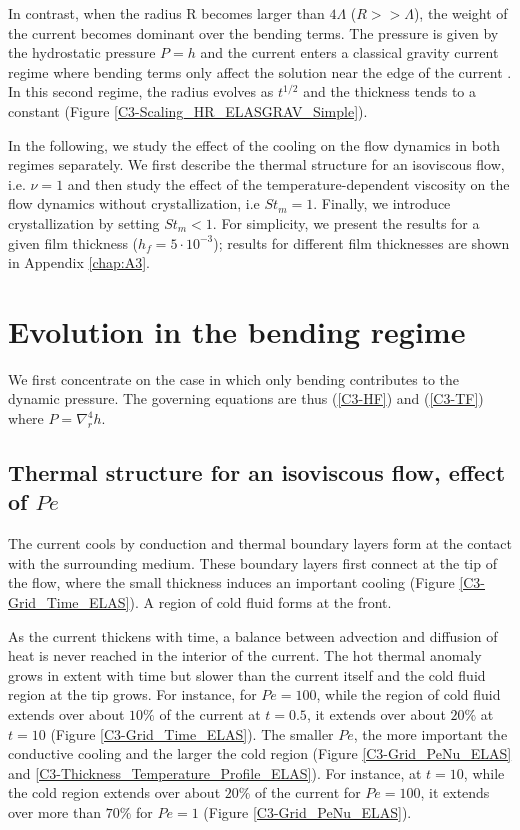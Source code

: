 In  contrast,  when  the  radius  R  becomes  larger  than  $4\Lambda$
($R>>\Lambda$), the  weight of the  current becomes dominant  over the
bending  terms.  The  pressure is  given by  the hydrostatic  pressure
$P =  h$ and  the current  enters a  classical gravity  current regime
where bending  terms only  affect the  solution near  the edge  of the
current  \citep{Huppert:1982a,Michaut:2011kg,Lister:2013ia}.  In  this
second regime, the radius evolves as $t^{1/2}$ and the thickness tends
to a constant (Figure \ref{C3-Scaling_HR_ELASGRAV_Simple}).

In  the following,  we study  the effect  of the  cooling on  the flow
dynamics in  both regimes  separately. We  first describe  the thermal
structure  for an  isoviscous flow,  i.e. $\nu=1$  and then  study the
effect  of the  temperature-dependent viscosity  on the  flow dynamics
without  crystallization,  i.e  $St_m   =1$.   Finally,  we  introduce
crystallization by  setting $St_m<1$.  For simplicity,  we present the
results for a given  film thickness ($h_f=5\cdot10^{-3}$); results for
different     film    thicknesses     are     shown    in     Appendix
\ref{chap:A3}.

\section{Evolution in the bending regime}
\label{C3-sec:evol-bend-regime}

We first concentrate on the case  in which only bending contributes to
the dynamic pressure.  The  governing equations are thus (\ref{C3-HF})
and (\ref{C3-TF}) where $P=\nabla_r^4h$.

\subsection{Thermal structure for an isoviscous flow, effect of $Pe$}
\label{C3-sec:thermal-structure-an}

The current  cools by conduction  and thermal boundary layers  form at
the contact with the surrounding  medium.  These boundary layers first
connect at the  tip of the flow, where the  small thickness induces an
important cooling (Figure \ref{C3-Grid_Time_ELAS}).   A region of cold
fluid forms at the front.

As the  current thickens  with time, a  balance between  advection and
diffusion of heat is never reached in the interior of the current. The
hot thermal  anomaly grows  in extent  with time  but slower  than the
current  itself and  the  cold fluid  region at  the  tip grows.   For
instance, for $Pe  =100$, while the region of cold  fluid extends over
about $10\%$ of  the current at $t=0.5$, it extends  over about $20\%$
at $t  =10$ (Figure  \ref{C3-Grid_Time_ELAS}).  The smaller  $Pe$, the
more important the  conductive cooling and the larger  the cold region
(Figure                   \ref{C3-Grid_PeNu_ELAS}                  and
\ref{C3-Thickness_Temperature_Profile_ELAS}).    For    instance,   at
$t=10$, while the cold region extends over about $20\%$ of the current
for  $Pe=100$, it  extends over  more than  $70\%$ for  $Pe=1$ (Figure
\ref{C3-Grid_PeNu_ELAS}).

